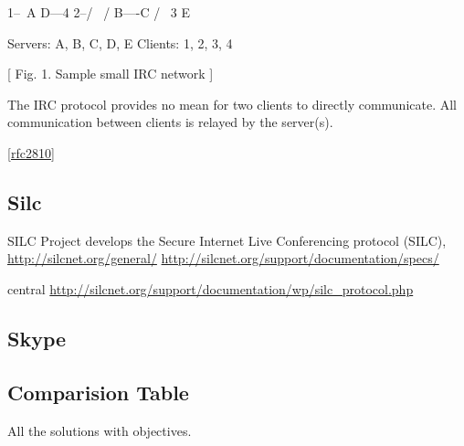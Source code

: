                        1--\
                           A        D---4
                       2--/ \      /
                             B----C
                            /      \
                           3        E

   Servers: A, B, C, D, E         Clients: 1, 2, 3, 4

                    [ Fig. 1. Sample small IRC network ]


   The IRC protocol provides no mean for two clients to directly
   communicate.  All communication between clients is relayed by the
   server(s).

      \ref{rfc2810}


\subsection{Silc}
SILC Project develops the Secure Internet Live Conferencing protocol (SILC),
\url{http://silcnet.org/general/}
\url{http://silcnet.org/support/documentation/specs/}

central
\url{http://silcnet.org/support/documentation/wp/silc_protocol.php}


\subsection{Skype}


\subsection{Comparision Table}
All the solutions with objectives.
